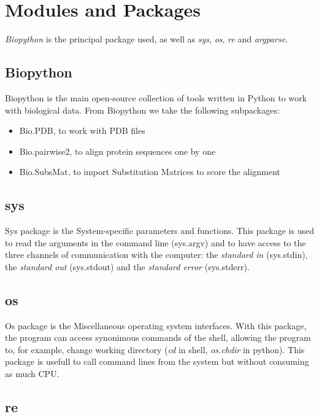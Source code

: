 \documentclass[a4paper,12pt]{report}
\begin{document}
\section{Modules and Packages}

\textit{Biopython} is the principal package used, as well as \textit{sys}, \textit{os}, \textit{re} and \textit{argparse}. 

\subsection{Biopython}

Biopython is the main open-source collection of tools written in Python to work with biological data. From Biopython we take the following subpackages:

\begin{itemize}
\item Bio.PDB, to work with PDB files
\item Bio.pairwise2, to align protein sequences one by one
\item Bio.SubsMat, to import Substitution Matrices to score the alignment
\end{itemize}


\subsection{sys}

Sys package is the System-specific parameters and functions. This package is used to read the arguments in the command line (sys.argv) and to have access to the three channels of communication with the computer: the \textit{standard in} (sys.stdin), the \textit{standard out} (sys.stdout) and the \textit{standard error} (sys.stderr).

\subsection{os}

Os package is the Miscellaneous operating system interfaces. With this package, the program can access synonimous commands of the shell, allowing the program to, for example, change working directory (\textit{cd} in shell, \textit{os.chdir} in python). 
This package is usefull to call command lines from the system but without consuming as much CPU.

\subsection{re}
\end{document}
